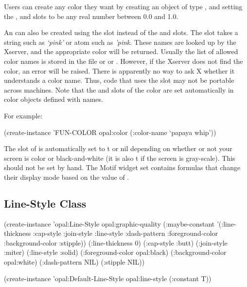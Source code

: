 Users can create any color they want by creating an
object of type , and setting the ,  and
 slots to be any real number between 0.0 and 1.0.

An  can also be created using the  slot
instead of the  and  slots.  The
 slot takes a
string such as {\it `pink'} or atom such as {\it 'pink}.  These names are
looked up by the Xserver, and the appropriate color will be returned.
Usually the list of allowed color names is stored in the
file  or
 or .
However, if the Xserver does not find the color, an error will be
raised.  There is apparently no way to ask X whether it understands a
color name.  Thus, code that uses the  slot may
not be portable across machines.  Note that the  and
 slots of the color are set automatically in color objects
defined with names.

For example:
\begin{programexample}
(create-instance 'FUN-COLOR opal:color (:color-name `papaya whip'))
\end{programexample}

The  slot of  is automatically set to {\sc t} or
{\sc nil} depending on whether or not your screen is color or
black-and-white (it is also {\sc t} if the screen is gray-scale).
This should not be set by hand.  The Motif widget set contains formulas
that change their display mode based on the value of .


\begin{group}
\section{Line-Style Class}

\vspace{.5 line}
\begin{programexample}
(create-instance 'opal:Line-Style opal:graphic-quality
  (:maybe-constant '(:line-thickness :cap-style :join-style :line-style :dash-pattern
		     :foreground-color :background-color :stipple))
  (:line-thickness 0)
  (:cap-style :butt)
  (:join-style :miter)
  (:line-style :solid)
  (:foreground-color opal:black)
  (:background-color opal:white)
  (:dash-pattern NIL)
  (:stipple NIL))

(create-instance 'opal:Default-Line-Style opal:line-style
   (:constant T))
\end{programexample}
\end{group}
\vspace{.5 line}

